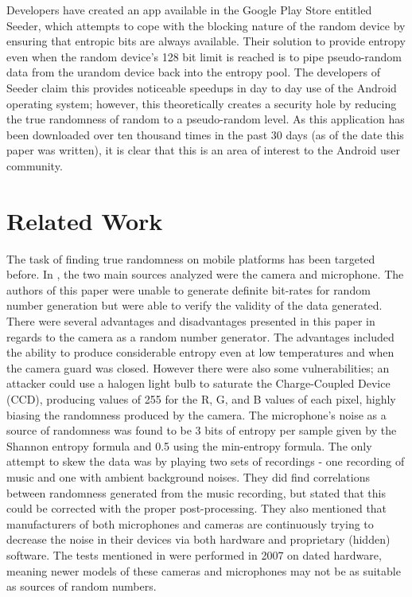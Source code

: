 \documentclass[conference]{IEEEtran}
\begin{document}
Developers have created an app available in the Google Play Store entitled Seeder, which attempts to cope with the blocking nature of the random
device by ensuring that entropic bits are always available.  Their solution to provide entropy even when the random device's 128 bit limit is
reached is to pipe pseudo-random data from the urandom device back into the entropy pool. The developers of Seeder claim this provides noticeable
speedups in day to day use of the Android operating system; however, this theoretically creates a security hole by reducing the true randomness of
random to a pseudo-random level. As this application has been downloaded over ten thousand times in the past 30 days (as of the date this paper
was written), it is clear that this is an area of interest to the Android user community.

\section{Related Work}
The task of finding true randomness on mobile platforms has been targeted before. In \cite{Krhovjak}, the two main sources analyzed were the 
camera and microphone. The authors of this paper were unable to generate definite bit-rates for random number generation but were able to verify
the validity of the data generated.  There were several advantages and disadvantages presented in this paper in regards to the camera as a random
number generator. The advantages included the ability to produce considerable entropy even at low temperatures and when the camera guard was
closed. However there were also some vulnerabilities; an attacker could use a halogen light bulb to saturate the Charge-Coupled
Device (CCD), producing values of 255 for the R, G, and B values of each pixel, highly biasing the randomness produced by the camera. 
The microphone's noise as a source of randomness was found to be 3 bits of entropy per sample given by the Shannon entropy formula and 0.5 using the
min-entropy formula. The only attempt to skew the data was by playing two sets of recordings - one recording of music and one with ambient background
noises. They did find correlations between randomness generated from the music recording, but stated that this could be corrected with the proper
post-processing.  They also mentioned that manufacturers of both microphones and cameras are continuously trying to decrease the noise in their devices
via both hardware and proprietary (hidden) software. The tests mentioned in \cite{Krhovjak} were performed in 2007 on dated hardware, meaning newer
models of these cameras and microphones may not be as suitable as sources of random numbers.
\end{document}
